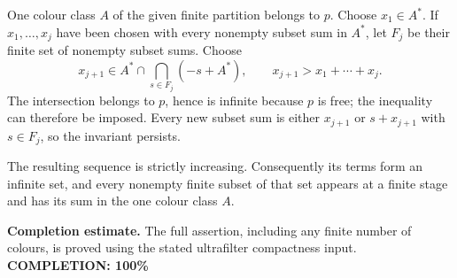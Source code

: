One colour class $A$ of the given finite partition belongs to $p$. Choose $x_1\in A^*$. If $x_1,\ldots,x_j$ have been chosen with every nonempty subset sum in $A^*$, let $F_j$ be their finite set of nonempty subset sums. Choose
\[
 x_{j+1}\in A^*\cap\bigcap_{s\in F_j}(-s+A^*),
 \qquad x_{j+1}>x_1+\cdots+x_j.
\]
The intersection belongs to $p$, hence is infinite because $p$ is free; the inequality can therefore be imposed. Every new subset sum is either $x_{j+1}$ or $s+x_{j+1}$ with $s\in F_j$, so the invariant persists.

The resulting sequence is strictly increasing. Consequently its terms form an infinite set, and every nonempty finite subset of that set appears at a finite stage and has its sum in the one colour class $A$.

\textbf{Completion estimate.}
The full assertion, including any finite number of colours, is proved using the stated ultrafilter compactness input.
\textbf{COMPLETION: 100\%}
